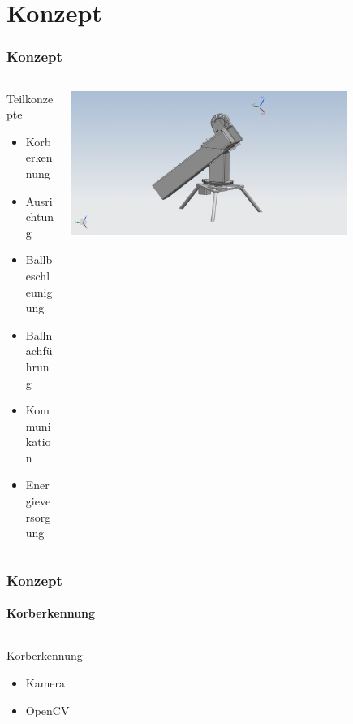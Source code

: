 \section{Konzept} %
\begin{frame}
    \frametitle{Konzept}
    \begin{columns}
        \begin{column}{0.4\textwidth}
            \begin{block}{Teilkonzepte}
                \begin{itemize}
                    \item<2-> Korberkennung
                    \item<3-> Ausrichtung
                    \item<4-> Ballbeschleunigung
                    \item<5-> Ballnachführung
                    \item<6-> Kommunikation
                    \item<7-> Energieversorgung
                \end{itemize}
            \end{block}
        \end{column}
        \begin{column}{0.6\textwidth}
            \centering
            \includegraphics[width=0.8\textwidth, trim = 150mm 50 150mm 10, clip]{../doc/fig/Gesamt_bg1.jpg}
        \end{column}
    \end{columns}
\end{frame}

\begin{frame}
    \frametitle{Konzept}
    \framesubtitle{Korberkennung}
    \begin{columns}
        \begin{column}{0.4\textwidth}
            \begin{block}{Korberkennung}
                \begin{itemize}
                    \item Kamera
                    \item OpenCV
                \end{itemize}
            \end{block}
        \end{column}
        \begin{column}{0.6\textwidth}
        \end{column}
    \end{columns}
\end{frame}

